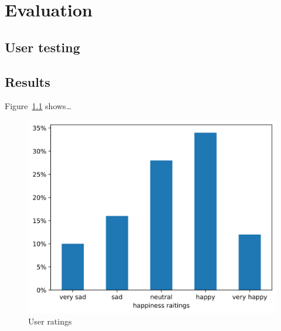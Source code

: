 \chapter{Evaluation}
\label{ch:evaluation}


\section{User testing}

\section{Results}

Figure~\ref{fig:user-ratings} shows…

\begin{figure}[H]
\centering
\includegraphics[width=.9\linewidth]{./figures/05-user-results}
% 
\caption{User ratings}
\label{fig:user-ratings}
\end{figure}

